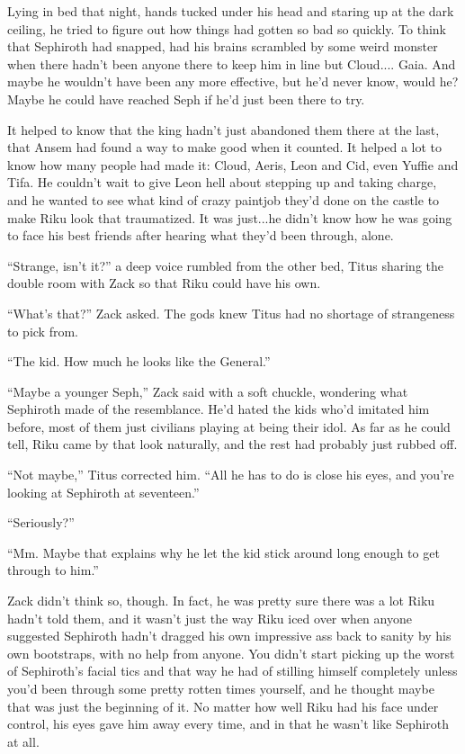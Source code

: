 Lying in bed that night, hands tucked under his head and staring up at the dark ceiling, he tried to figure out how things had gotten so bad so quickly. To think that Sephiroth had snapped, had his brains scrambled by some weird monster when there hadn't been anyone there to keep him in line but Cloud.... Gaia. And maybe he wouldn't have been any more effective, but he'd never know, would he? Maybe he could have reached Seph if he'd just been there to try.

It helped to know that the king hadn't just abandoned them there at the last, that Ansem had found a way to make good when it counted. It helped a lot to know how many people had made it: Cloud, Aeris, Leon and Cid, even Yuffie and Tifa. He couldn't wait to give Leon hell about stepping up and taking charge, and he wanted to see what kind of crazy paintjob they'd done on the castle to make Riku look that traumatized. It was just...he didn't know how he was going to face his best friends after hearing what they'd been through, alone.

``Strange, isn't it?'' a deep voice rumbled from the other bed, Titus sharing the double room with Zack so that Riku could have his own.

``What's that?'' Zack asked. The gods knew Titus had no shortage of strangeness to pick from.

``The kid. How much he looks like the General.''

``Maybe a younger Seph,'' Zack said with a soft chuckle, wondering what Sephiroth made of the resemblance. He'd hated the kids who'd imitated him before, most of them just civilians playing at being their idol. As far as he could tell, Riku came by that look naturally, and the rest had probably just rubbed off.

``Not maybe,'' Titus corrected him. ``All he has to do is close his eyes, and you're looking at Sephiroth at seventeen.''

``Seriously?''

``Mm. Maybe that explains why he let the kid stick around long enough to get through to him.''

Zack didn't think so, though. In fact, he was pretty sure there was a lot Riku hadn't told them, and it wasn't just the way Riku iced over when anyone suggested Sephiroth hadn't dragged his own impressive ass back to sanity by his own bootstraps, with no help from anyone. You didn't start picking up the worst of Sephiroth's facial tics and that way he had of stilling himself completely unless you'd been through some pretty rotten times yourself, and he thought maybe that was just the beginning of it. No matter how well Riku had his face under control, his eyes gave him away every time, and in that he wasn't like Sephiroth at all.

